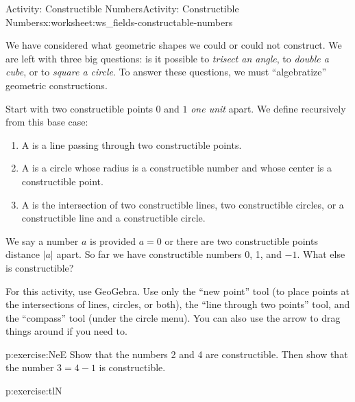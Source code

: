 \documentclass[11pt]{book}
\begin{document}
%
%
\typeout{************************************************}
\typeout{************************************************}
%
\begin{worksheet-subsection}{Activity: Constructible Numbers}{}{Activity: Constructible Numbers}{}{}{x:worksheet:ws_fields-constructable-numbers}
\begin{introduction}{}%
We have considered what geometric shapes we could or could not construct.  We are left with three big questions: is it possible to \emph{trisect an angle}, to \emph{double a cube}, or to \emph{square a circle}.  To answer these questions, we must ``algebratize'' geometric constructions.%
\par
Start with two constructible points \(0\) and \(1\) \emph{one unit} apart.  We define  recursively from this base case:%
\begin{enumerate}[label=(\alph*)]
\item{}A  is a line passing through two constructible points.%
\item{}A  is a circle whose radius is a constructible number and whose center is a constructible point.%
\item{}A  is the intersection of two constructible lines, two constructible circles, or a constructible line and a constructible circle.%
\end{enumerate}
%
\par
We say a number \(a\) is  provided \(a = 0\) or there are two constructible points distance \(|a|\) apart.  So far we have constructible numbers 0, 1, and \(-1\).  What else is constructible?%
\par
For this activity, use GeoGebra.  Use only the ``new point'' tool (to place points at the intersections of lines, circles, or both), the ``line through two points'' tool, and the ``compass'' tool (under the circle menu).  You can also use the arrow to drag things around if you need to.%
\end{introduction}%
\begin{divisionexercise}{1}{}{}{p:exercise:NeE}%
Show that the numbers 2 and 4 are constructible.  Then show that the number \(3 = 4 - 1\) is constructible.%
\end{divisionexercise}%
\begin{divisionexercise}{2}{}{}{p:exercise:tlN}%

\end{divisionexercise}
\end{worksheet-subsection}
\end{document}
